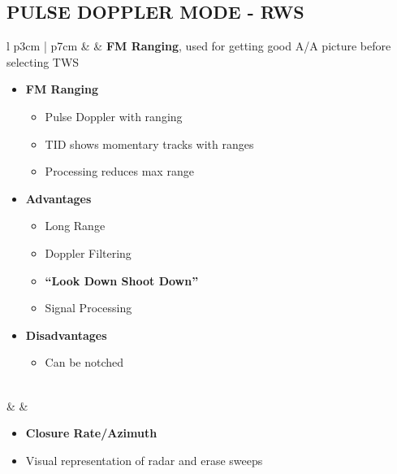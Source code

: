 \documentclass[8pt,usenames,dvipsnames,twoside]{article}
\begin{document}
		\subsection{PULSE DOPPLER MODE - RWS}
		\label{sec:awg9-rws}
		\begin{center}
			\begin{longtable}{l p{3cm} | p{7cm}}
				\toprule
				\textbullet &  & \textbf{FM Ranging}, used for getting good A/A picture before selecting TWS
				
				\begin{minipage}[t]{\linewidth}
					\vspace{-7pt}
					\begin{itemize}
						\item \textbf{FM Ranging}
						\begin{itemize}
							\item Pulse Doppler with ranging
							\item TID shows momentary tracks with ranges
							\item Processing reduces max range
						\end{itemize}
						\item \textbf{Advantages}
						\begin{itemize}
							\item Long Range
							\item Doppler Filtering
							\item \textbf{``Look Down Shoot Down''}
							\item Signal Processing 
						\end{itemize}
						\item \textbf{Disadvantages}
						\begin{itemize}
							\item Can be notched
						\end{itemize}
					\end{itemize}
				\end{minipage} \\
				\midrule
				\textbullet &  & 
				\begin{minipage}[t]{\linewidth}
					\vspace{-7pt}
					\begin{itemize}
						\item \textbf{Closure Rate/Azimuth}
						\item Visual representation of radar and erase sweeps
					\end{itemize}
				\end{minipage} \\

\end{longtable}
\end{center}
\end{document}
